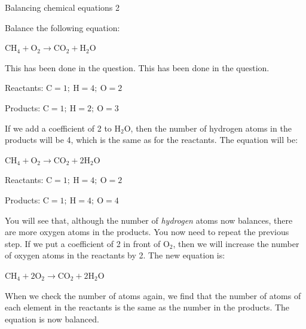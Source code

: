            \label{m38726*secfhsst!!!underscore!!!id394}
      \noindent
\begin{wex}{Balancing chemical equations 2}{Balance the following equation:
\begin{center}
${\text{CH}_{4} + \text{O}_{2} \rightarrow \text{CO}_{2} + \text{H}_{2}\text{O}}$
\end{center}
}

{ This has been done in the question.
 This has been done in the question.

Reactants: $\text{C} = 1;~ \text{H} = 4;~ \text{O} = 2$

Products: $\text{C} = 1;~ \text{H} = 2;~ \text{O} = 3$



If we add a coefficient of 2 to $\text{H}_{2}\text{O}$, then the number of hydrogen atoms in the products will be 4, which is the same as for the reactants. The equation will be:

\begin{center}
${\text{CH}_{4} + \text{O}_{2} \rightarrow \text{CO}_{2} + 2\text{H}_{2}\text{O}}$\\
\end{center}



Reactants: $\text{C} = 1;~ \text{H} = 4;~ \text{O} = 2$

Products: $\text{C} = 1;~ \text{H} = 4; ~\text{O} = 4$

You will see that, although the number of \textit{hydrogen} atoms now balances, there are more oxygen atoms in the products. You now need to repeat the previous step. If we put a coefficient of 2 in front of $\text{O}_{2}$, then we will increase the number of oxygen atoms in the reactants by 2. The new equation is:

\begin{center}
${\text{CH}_{4} + 2\text{O}_{2} \rightarrow \text{CO}_{2} + 2\text{H}_{2}\text{O}}$
\end{center}

When we check the number of atoms again, we find that the number of atoms of each element in the reactants is the same as the number in the products. The equation is now balanced.
}
\end{wex}
    \noindent
\label{m38726*secfhsst!!!underscore!!!id501}
